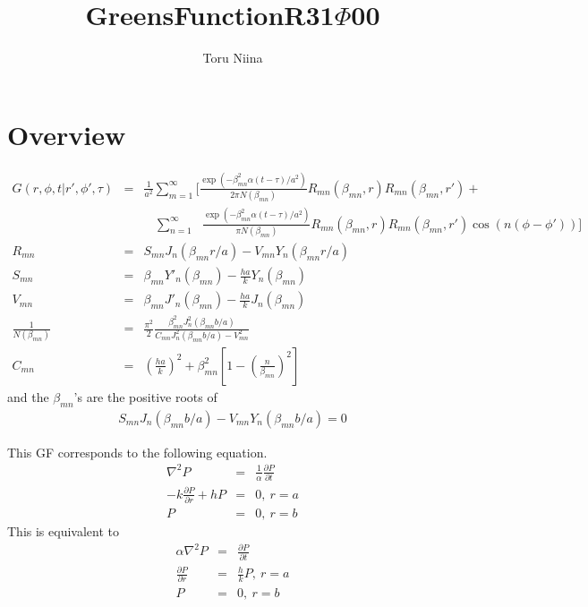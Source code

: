 \documentclass{article}
\begin{document}
\title{GreensFunctionR31$\Phi$00}
\author{Toru Niina}
\maketitle

\section{Overview}

\begin{eqnarray}
    G(r, \phi, t | r', \phi', \tau) &=&
    \frac{1}{a^2} \sum_{m=1}^{\infty} \Bigg[
    \frac{\exp(-\beta_{mn}^2\alpha(t-\tau)/a^2)}{2\pi N(\beta_{mn})}
    R_{mn}(\beta_{mn}, r) R_{mn}(\beta_{mn}, r') +
\nonumber\\
    & &\ \ \ \ \sum_{n=1}^{\infty}\ \ \ 
    \frac{\exp(-\beta_{mn}^2\alpha(t-\tau)/a^2)}{\pi N(\beta_{mn})}
    R_{mn}(\beta_{mn}, r) R_{mn}(\beta_{mn}, r')\cos(n(\phi - \phi'))\Bigg]
\\
    R_{mn} &=& S_{mn}J_n(\beta_{mn}r/a) - V_{mn}Y_n(\beta_{mn}r/a)
\\
    S_{mn} &=& \beta_{mn}Y'_n(\beta_{mn}) - \frac{ha}{k}Y_n(\beta_{mn})
\\
    V_{mn} &=& \beta_{mn}J'_n(\beta_{mn}) - \frac{ha}{k}J_n(\beta_{mn})
\\
    \frac{1}{N(\beta_{mn})} &=&
        \frac{\pi^2}{2} \frac{\beta_{mn}^2 J_n^2(\beta_{mn}b/a)}
        {C_{mn}J_n^2(\beta_{mn}b/a) - V_{mn}^2}
\\
    C_{mn} &=& \left(\frac{ha}{k}\right)^2 + \beta_{mn}^2\left[1 - \left(\frac{n}{\beta_{mn}}\right)^2\right]
\end{eqnarray}
and the $\beta_{mn}$'s are the positive roots of
\begin{eqnarray}
    S_{mn}J_n(\beta_{mn}b/a) - V_{mn}Y_n(\beta_{mn}b/a) = 0
\end{eqnarray}


This GF corresponds to the following equation.
\begin{eqnarray}
    \nabla^2 P &=& \frac{1}{\alpha}\frac{\partial P}{\partial t}
\\
    -k\frac{\partial P}{\partial r} + hP &=& 0,\ r = a
\\
    P &=& 0,\ r = b
\end{eqnarray}
This is equivalent to
\begin{eqnarray}
    \alpha\nabla^2 P &=& \frac{\partial P}{\partial t}     \\
    \frac{\partial P}{\partial r} &=& \frac{h}{k}P,\ r = a \\
    P &=& 0,\ r = b
\end{eqnarray}
\end{document}
